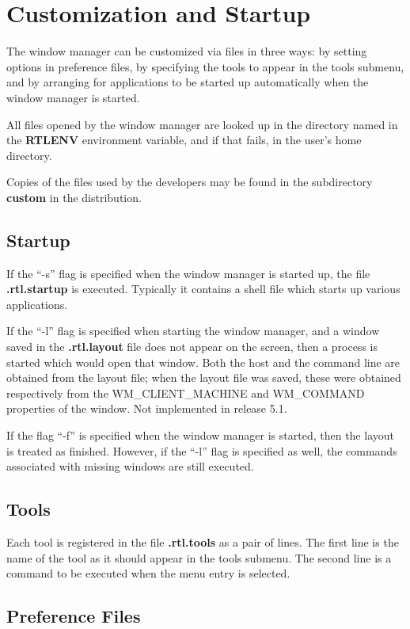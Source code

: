 \section{Customization and Startup}

The window manager can be customized via files in three ways: by setting
options in preference files, by specifying the tools to appear in the
tools submenu, and by arranging for applications to be started up
automatically when the window manager is started.

All files opened by the window manager are looked up in the
directory named in the {\bf RTLENV} environment variable, and if that
fails, in the user's home directory.

Copies of the files used by the developers may be found in the
subdirectory {\bf custom} in the distribution.

\subsection{Startup}

If the ``-s'' flag is specified when the window manager is started up,
the file {\bf .rtl.startup} is executed.
Typically it contains a shell file which starts up various applications.

If the ``-l'' flag is specified when starting the window manager, and a
window saved in the {\bf .rtl.layout} file does not appear on the screen,
then a process is started which would open that window.  Both the host
and the command line are obtained from the layout file;  when the layout
file was saved, these were obtained respectively from the
{\sc WM\_CLIENT\_MACHINE} and {\sc WM\_COMMAND} properties of the window.
Not implemented in release 5.1.

If the flag ``-f'' is specified when the window manager is started, then
the layout is treated as finished.  However, if the ``-l'' flag is
specified as well, the commands associated with missing windows are still
executed.

\subsection{Tools}

Each tool is registered in the file {\bf .rtl.tools} as a pair of lines.
The first line is the name of the tool as it should appear in the tools
submenu.
The second line is a command to be executed when the menu entry is
selected.

\subsection{Preference Files}


